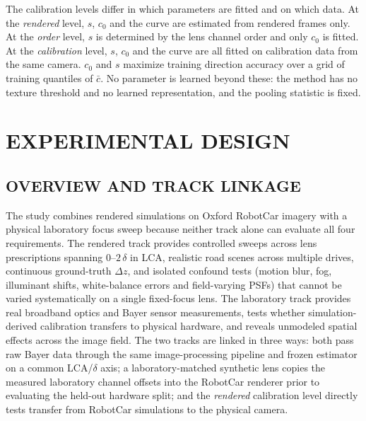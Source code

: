 \documentclass{ieee-ojvt}
\begin{document}
The calibration levels differ in which parameters are fitted and on which data. At the \emph{rendered} level, $s$, $c_0$ and the curve are estimated from rendered frames only. At the \emph{order} level, $s$ is determined by the lens channel order and only $c_0$ is fitted. At the \emph{calibration} level, $s$, $c_0$ and the curve are all fitted on calibration data from the same camera. $c_0$ and $s$ maximize training direction accuracy over a grid of training quantiles of $\bar c$. No parameter is learned beyond these: the method has no texture threshold and no learned representation, and the pooling statistic is fixed.

\section{EXPERIMENTAL DESIGN}\label{sec:design}
\subsection{OVERVIEW AND TRACK LINKAGE}
The study combines rendered simulations on Oxford RobotCar imagery with a physical laboratory focus sweep because neither track alone can evaluate all four requirements. The rendered track provides controlled sweeps across \MthreeNlenses{} lens prescriptions spanning $0$--$2\,\delta$ in LCA, realistic road scenes across multiple drives, continuous ground-truth $\Delta z$, and isolated confound tests (motion blur, fog, illuminant shifts, white-balance errors and field-varying PSFs) that cannot be varied systematically on a single fixed-focus lens. The laboratory track provides real broadband optics and Bayer sensor measurements, tests whether simulation-derived calibration transfers to physical hardware, and reveals unmodeled spatial effects across the image field. The two tracks are linked in three ways: both pass raw Bayer data through the same image-processing pipeline and frozen estimator on a common LCA/$\delta$ axis; a laboratory-matched synthetic lens copies the measured laboratory channel offsets into the RobotCar renderer prior to evaluating the held-out hardware split; and the \emph{rendered} calibration level directly tests transfer from RobotCar simulations to the physical camera.
\end{document}
